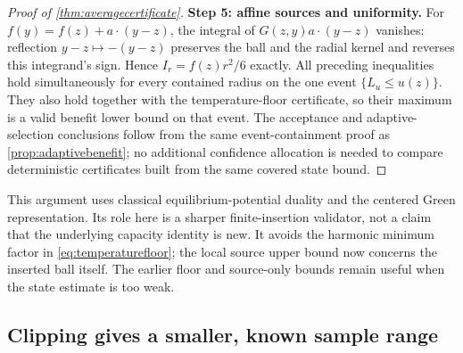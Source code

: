 \begin{proof}[Proof of \cref{thm:averagecertificate}]
\textbf{Step 5: affine sources and uniformity.}
For $f(y)=f(z)+a\cdot(y-z)$, the integral of $G(z,y)a\cdot(y-z)$ vanishes:
reflection $y-z\mapsto-(y-z)$ preserves the ball and the radial kernel and
reverses this integrand's sign. Hence $I_r=f(z)r^2/6$ exactly.
All preceding inequalities hold simultaneously for every contained radius
on the one event $\{L_u\le u(z)\}$. They also hold together with the
temperature-floor certificate, so their maximum is a valid benefit lower
bound on that event. The acceptance and adaptive-selection conclusions
follow from the same event-containment proof as \cref{prop:adaptivebenefit};
no additional confidence allocation is needed to compare deterministic
certificates built from the same covered state bound.
\end{proof}

This argument uses classical equilibrium-potential duality and the centered
Green representation. Its role here is a sharper finite-insertion validator,
not a claim that the underlying capacity identity is new. It avoids the
harmonic minimum factor in \cref{eq:temperaturefloor}; the local source
upper bound now concerns the inserted ball itself. The earlier floor and
source-only bounds remain useful when the state estimate is too weak.

\subsection{Clipping gives a smaller, known sample range}

